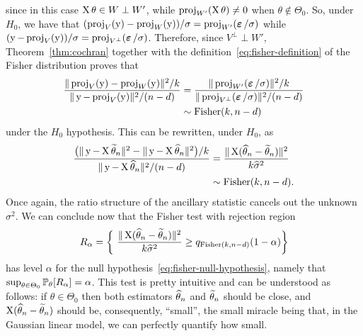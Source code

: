 since in this case $\bX \theta \in W \perp W'$, while $\proj_{W'}(\bX \theta) \neq 0$ when $\theta \notin \Theta_0$.
So, under $H_0$, we have that $(\proj_V(\by) - \proj_W(\by)) / \sigma = \proj_{W'}(\beps / \sigma)$ while 
$(\by - \proj_V(\by)) / \sigma = \proj_{V^\perp}(\beps / \sigma)$. 
Therefore, since $V^\perp \perp W'$, Theorem~\ref{thm:cochran} together with the definition~\eqref{eq:fisher-definition} of the Fisher distribution proves that
\begin{align*}
	\frac{\norm{\proj_V(\by) - \proj_W(\by)}^2 / k}{\norm{\by - \proj_V(\by)}^2 / (n - d)} 
	&= \frac{\norm{\proj_{W'}(\beps / \sigma)}^2 / k}{\norm{\proj_{V^\perp}(\beps / \sigma)}^2 / (n-d)} \\
	&\sim \fis(k, n-d)
\end{align*}
under the $H_0$ hypothesis.%
This can be rewritten, under $H_0$, as 
\begin{align*}
	\frac{\big(\norm{\by - \bX \wt \theta_n}^2 - \norm{\by - \bX \wh \theta_n}^2\big) / k}
	{\norm{\by - \bX \wh \theta_n}^2 / (n - d)} 
	&= \frac{\norm{\bX (\wh \theta_n - \wt \theta_n)}^2}{k \wh \sigma^2} \\
	&\sim \fis(k, n-d).
\end{align*}
Once again, the ratio structure of the ancillary statistic cancels out the unknown $\sigma^2$.
We can conclude now that the Fisher test with rejection region
\begin{equation*}
	R_\alpha = \bigg\{  \frac{\norm{\bX (\wh \theta_n - \wt \theta_n)}^2}{k \wh \sigma^2}  \geq q_{\fis(k, n-d)}(1 - \alpha)  \bigg\}
\end{equation*}
has level $\alpha$ for the null hypothesis~\eqref{eq:fisher-null-hypothesis}, namely that $\sup_{\theta \in \Theta_0} \P_\theta[R_\alpha] = \alpha$.
This test is pretty intuitive and can be understood as follows: if $\theta \in \Theta_0$ then both estimators $\wh \theta_n$ and $\wt \theta_n$ should be close, and $\bX (\wh \theta_n - \wt \theta_n)$ should be, consequently, ``small'', the small miracle being that, in the Gaussian linear model, we can perfectly quantify how small.

